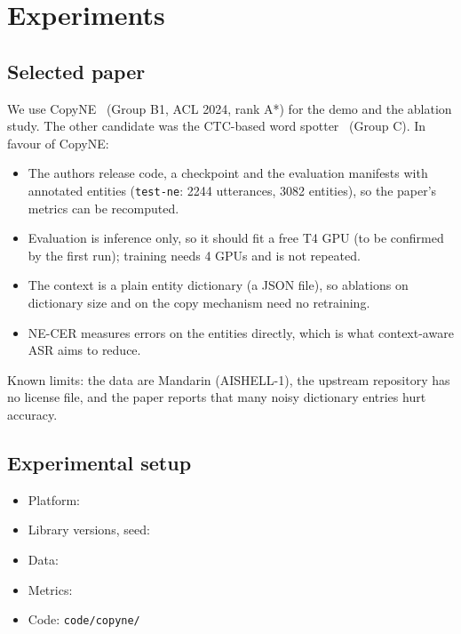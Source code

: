 \section{Experiments}\label{sec:exp}

\subsection{Selected paper}
We use CopyNE~\cite{lin2024copyne} (Group B1, ACL 2024, rank A*) for the demo and the ablation study.
The other candidate was the CTC-based word spotter~\cite{andrusenko2024ctcws} (Group C). In favour of CopyNE:
\begin{itemize}
  \item The authors release code, a checkpoint and the evaluation manifests with annotated entities
    (\texttt{test-ne}: 2244 utterances, 3082 entities), so the paper's metrics can be recomputed.
  \item Evaluation is inference only, so it should fit a free T4 GPU (to be confirmed by the first run); training needs 4 GPUs and is not repeated.
  \item The context is a plain entity dictionary (a JSON file), so ablations on dictionary size and on the copy
    mechanism need no retraining.
  \item NE-CER measures errors on the entities directly, which is what context-aware ASR aims to reduce.
\end{itemize}
Known limits: the data are Mandarin (AISHELL-1), the upstream repository has no license file, and the paper reports
that many noisy dictionary entries hurt accuracy. 

\subsection{Experimental setup}
\begin{itemize}
  \item Platform: 
  \item Library versions, seed: \todo{}
  \item Data: 
  \item Metrics: 
  \item Code: \texttt{code/copyne/}
\end{itemize}

